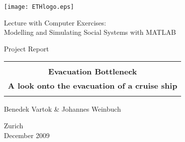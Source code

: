 
\thispagestyle{empty}

\begin{center}
\texttt{[image: ETHlogo.eps]}

\bigskip


\bigskip


\bigskip


\LARGE{ 	Lecture with Computer Exercises:\\ }
\LARGE{ Modelling and Simulating Social Systems with MATLAB\\}

\bigskip

\bigskip

\small{Project Report}\\

\bigskip

\bigskip

\bigskip

\bigskip


\begin{tabular}{|c|}
\hline
\\
\textbf{\LARGE{Evacuation Bottleneck}}\\
\textbf{\LARGE{A look onto the evacuation of a cruise ship}}\\
\\
\hline
\end{tabular}
\bigskip

\bigskip

\bigskip

\LARGE{Benedek Vartok \& Johannes Weinbuch}



\bigskip

\bigskip

\bigskip

\bigskip

\bigskip

\bigskip

\bigskip

\bigskip

Zurich\\
December 2009\\

\end{center}


